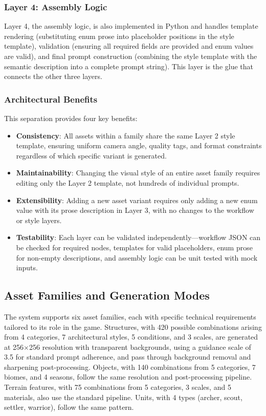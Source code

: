 \documentclass[conference]{IEEEtran}
\begin{document}
\subsubsection{Layer 4: Assembly Logic}

Layer 4, the assembly logic, is also implemented in Python and handles template rendering (substituting enum prose into placeholder positions in the style template), validation (ensuring all required fields are provided and enum values are valid), and final prompt construction (combining the style template with the semantic description into a complete prompt string). This layer is the glue that connects the other three layers.

\subsubsection{Architectural Benefits}

This separation provides four key benefits:

\begin{itemize}
\item \textbf{Consistency}: All assets within a family share the same Layer 2 style template, ensuring uniform camera angle, quality tags, and format constraints regardless of which specific variant is generated.
\item \textbf{Maintainability}: Changing the visual style of an entire asset family requires editing only the Layer 2 template, not hundreds of individual prompts.
\item \textbf{Extensibility}: Adding a new asset variant requires only adding a new enum value with its prose description in Layer 3, with no changes to the workflow or style layers.
\item \textbf{Testability}: Each layer can be validated independently---workflow JSON can be checked for required nodes, templates for valid placeholders, enum prose for non-empty descriptions, and assembly logic can be unit tested with mock inputs.
\end{itemize}

\subsection{Asset Families and Generation Modes}

The system supports six asset families, each with specific technical requirements tailored to its role in the game. Structures, with 420 possible combinations arising from 4 categories, 7 architectural styles, 5 conditions, and 3 scales, are generated at 256$\times$256 resolution with transparent backgrounds, using a guidance scale of 3.5 for standard prompt adherence, and pass through background removal and sharpening post-processing. Objects, with 140 combinations from 5 categories, 7 biomes, and 4 seasons, follow the same resolution and post-processing pipeline. Terrain features, with 75 combinations from 5 categories, 3 scales, and 5 materials, also use the standard pipeline. Units, with 4 types (archer, scout, settler, warrior), follow the same pattern.
\end{document}
